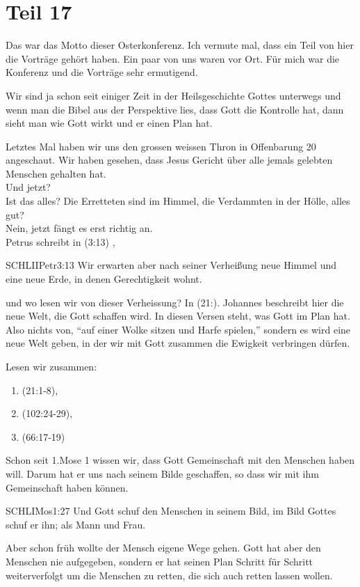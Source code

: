 \section{Teil 17}
\begin{otsblock}
        Das war das Motto dieser Osterkonferenz. Ich vermute mal, dass ein Teil von hier die Vorträge gehört haben. Ein paar von uns waren vor Ort. Für mich war die Konferenz und die Vorträge sehr ermutigend.

        Wir sind ja schon seit einiger Zeit in der Heilsgeschichte Gottes unterwegs und wenn man die Bibel aus der Perspektive lies, dass Gott die Kontrolle hat, dann sieht man wie Gott wirkt und er einen Plan hat.

        Letztes Mal haben wir uns den grossen weissen Thron in Offenbarung 20 angeschaut. Wir haben gesehen, dass Jesus Gericht über alle jemals gelebten Menschen gehalten hat. 
        \\ Und jetzt? 
        \\ Ist das alles? Die Erretteten sind im Himmel, die Verdammten in der Hölle, alles gut? \\ Nein, jetzt fängt es erst richtig an.\\
        Petrus schreibt in (3:13) , 
        \begin{bibelbox}{SCHL}{IIPetr}{3:13}
            Wir erwarten aber nach seiner Verheißung neue Himmel und eine neue Erde, in denen Gerechtigkeit wohnt.
        \end{bibelbox}
        und wo lesen wir von dieser Verheissung? In (21:). Johannes beschreibt hier die neue Welt, die Gott schaffen wird. In diesen Versen steht, was Gott im Plan hat. Also nichts von, \enquote{auf einer Wolke sitzen und Harfe spielen,} sondern es wird eine neue Welt geben, in der wir mit Gott zusammen die Ewigkeit verbringen dürfen. 
        
        Lesen wir zusammen: 
        \begin{enumerate}
            \item {}(21:1-8),
            \item {}(102:24-29),
            \item {}(66:17-19)
        \end{enumerate}     
        Schon seit 1.Mose 1 wissen wir, dass Gott Gemeinschaft mit den Menschen haben will. Darum hat er uns nach seinem Bilde geschaffen, so dass wir mit ihm Gemeinschaft haben können.
        \begin{bibelbox}{SCHL}{IMos}{1:27}
            Und Gott schuf den Menschen in seinem Bild, im Bild Gottes schuf er ihn; als Mann und Frau.
        \end{bibelbox}
        Aber schon früh wollte der Mensch eigene Wege gehen. Gott hat aber den Menschen nie aufgegeben, sondern er hat seinen Plan Schritt für Schritt weiterverfolgt um die Menschen zu retten, die sich auch retten lassen wollen. 


\end{otsblock}
